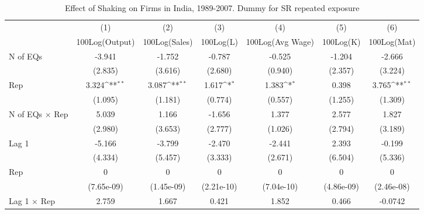 \begin{table}[htbp]\centering
\def\sym#1{\ifmmode^{#1}\else\(^{#1}\)\fi}
\caption{Effect of Shaking on Firms in India, 1989-2007. Dummy for SR repeated exposure}
\begin{tabular}{l*{6}{c}}
\toprule
                &\multicolumn{1}{c}{(1)}&\multicolumn{1}{c}{(2)}&\multicolumn{1}{c}{(3)}&\multicolumn{1}{c}{(4)}&\multicolumn{1}{c}{(5)}&\multicolumn{1}{c}{(6)}\\
                &\multicolumn{1}{c}{100Log(Output)}&\multicolumn{1}{c}{100Log(Sales)}&\multicolumn{1}{c}{100Log(L)}&\multicolumn{1}{c}{100Log(Avg Wage)}&\multicolumn{1}{c}{100Log(K)}&\multicolumn{1}{c}{100Log(Mat)}\\
\midrule
N of EQs        &   -3.941         &   -1.752         &   -0.787         &   -0.525         &   -1.204         &   -2.666         \\
                &  (2.835)         &  (3.616)         &  (2.680)         &  (0.940)         &  (2.357)         &  (3.224)         \\
\addlinespace
Rep             &    3.324\sym{**} &    3.087\sym{**} &    1.617\sym{*}  &    1.383\sym{*}  &    0.398         &    3.765\sym{**} \\
                &  (1.095)         &  (1.181)         &  (0.774)         &  (0.557)         &  (1.255)         &  (1.309)         \\
\addlinespace
N of EQs $\times$ Rep&    5.039         &    1.166         &   -1.656         &    1.377         &    2.577         &    1.827         \\
                &  (2.980)         &  (3.653)         &  (2.777)         &  (1.026)         &  (2.794)         &  (3.189)         \\
\addlinespace
Lag 1           &   -5.166         &   -3.799         &   -2.470         &   -2.441         &    2.393         &   -0.199         \\
                &  (4.334)         &  (5.457)         &  (3.333)         &  (2.671)         &  (6.504)         &  (5.336)         \\
\addlinespace
Rep             &        0         &        0         &        0         &        0         &        0         &        0         \\
                &(7.65e-09)         &(1.45e-09)         &(2.21e-10)         &(7.04e-10)         &(4.86e-09)         &(2.46e-08)         \\
\addlinespace
Lag 1 $\times$ Rep&    2.759         &    1.667         &    0.421         &    1.852         &    0.466         &  -0.0742         \\

\end{tabular}
\end{table}
